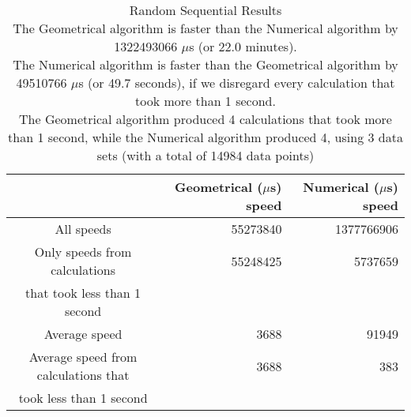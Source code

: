 \begin{table}[bth!]\footnotesize
 \begin{tabular}[3]{c|r|r}
 & Geometrical ($\mu$s) speed & Numerical ($\mu$s) speed\\
\hline
All speeds & 55273840 & 1377766906 \\ 
\hline 
Only speeds from calculations & 55248425 & 5737659 \\ 
that took less than 1 second & & \\ 
\hline
Average speed & 3688 & 91949 \\
\hline
Average speed from calculations that & 3688 & 383 \\ 
took less than 1 second & & \\ 
\end{tabular}\\ \\
\caption{Random Sequential Results\\
The Geometrical algorithm is faster than the Numerical algorithm by 1322493066 $\mu$s (or 22.0 minutes).\\
The Numerical algorithm is faster than the Geometrical algorithm by 49510766 $\mu$s (or 49.7 seconds), if we disregard every calculation that took more than 1 second.\\
The Geometrical algorithm produced 4 calculations that took more than 1 second, while the Numerical algorithm produced 4, using 3 data sets (with a total of 14984 data points)\\
}\label{sequential-random_speedtable}\end{table}